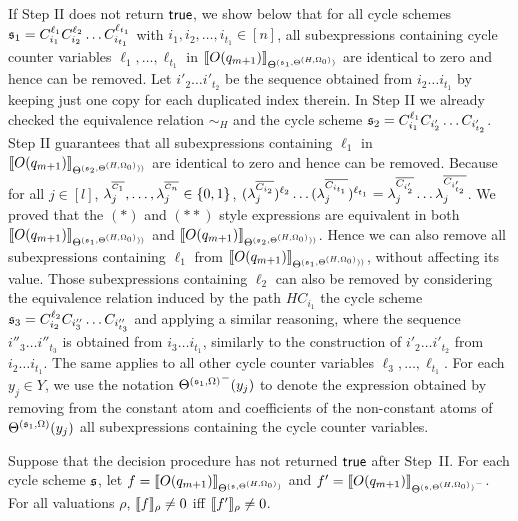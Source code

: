 \smallskip

If Step II does not return $\mathsf{true}$, we show below that for all cycle schemes ${\mathfrak{s} }_1=C_{i_1}^{\ell_1} C_{i_2}^{\ell_2} \dots C_{i_{t_1}}^{\ell_{t_1}}$ with $i_1,i_2,\dots,i_{t_1} \in [n]$, all subexpressions containing cycle counter variables $\ell_1,\dots, \ell_{t_1}$ in $\llbracket O(q_{m+1})\rrbracket_{\Theta^{({\mathfrak{s} }_1, \Theta^{(H,\Omega_0)})}}$ are identical to zero and hence can be removed. Let ${i'_2} \dots {i'_{t_2}}$ be the sequence obtained from $i_2 \dots i_{t_1}$ by keeping just one copy for each duplicated index therein.  
In Step II we already checked the equivalence relation $\sim_H$ and the cycle scheme ${\mathfrak{s} }_2=C_{i_1}^{\ell_1} C_{i'_2} \dots C_{i'_{t_2}}$. Step II guarantees that all subexpressions containing $\ell_1$ in 
$\llbracket O(q_{m+1})\rrbracket_{\Theta^{({\mathfrak{s} }_2, \Theta^{(H,\Omega_0)}))}}$ are identical to zero and hence can be removed.
Because for all $j\in[l]$, $\lambda^{^{\overline{C_1}}}_j, \dots, \lambda^{^{\overline{C_n}}}_j \in \{0,1\}$,   $(\lambda^{\overline{C_{i_2}}}_{j})^{\ell_2} \dots (\lambda^{\overline{C_{i_{t_1}}}}_{j})^{\ell_{t_1}} = \lambda^{\overline{C_{i'_2}}}_{j} \dots \lambda^{\overline{C_{i'_{t_2}}}}_{j}$. We proved that the $(\ast)$ and $(\ast\ast)$ style expressions are equivalent in both $\llbracket O(q_{m+1})\rrbracket_{\Theta^{({\mathfrak{s} }_1, \Theta^{(H,\Omega_0)}))}}$ and $\llbracket O(q_{m+1})\rrbracket_{\Theta^{({\mathfrak{s} }_2, \Theta^{(H,\Omega_0)}))}}$.
Hence we can also remove all subexpressions containing $\ell_1$ from  $\llbracket O(q_{m+1})\rrbracket_{\Theta^{({\mathfrak{s} }_1, \Theta^{(H,\Omega_0)}))}}$, without affecting its value.
Those subexpressions containing $\ell_2$ can also be removed by considering the equivalence relation induced by the path $HC_{i_1}$ the cycle scheme ${\mathfrak{s} }_3=C_{i_2}^{\ell_2} C_{i''_3} \dots C_{i''_{t_3}}$ and applying a similar reasoning, where the sequence ${i''_3} \dots {i''_{t_3}}$ is obtained from ${i_3} \dots  i_{t_1}$, similarly to the construction of ${i'_2} \dots {i'_{t_2}}$ from $i_2 \dots i_{t_1}$. The same applies to all other cycle counter variables $\ell_3,\dots,\ell_{t_1}$.
For each $y_j \in Y$, we use the notation ${\Theta^{({\mathfrak{s} }_1,\Omega)}}^-(y_j)$ to denote the expression obtained by removing from the constant atom and coefficients of the non-constant atoms of $\Theta^{({\mathfrak{s} }_1,\Omega)}(y_j)$ all subexpressions containing the cycle counter variables. 

\begin{lemma}\label{prop-bnd-domain-1}
	Suppose that the decision procedure has not returned $\mathsf{true}$ after Step~II. For each cycle scheme ${\mathfrak{s} }$, let $f=\llbracket O(q_{m+1})\rrbracket_{\Theta^{({\mathfrak{s} }, \Theta^{(H,\Omega_0)})}}$ and $f'=\llbracket O(q_{m+1})\rrbracket_{{\Theta^{({\mathfrak{s} }, \Theta^{(H,\Omega_0)})}}^-}$. For all valuations $\rho$, $\llbracket f\rrbracket_{\rho}\neq 0$ iff $\llbracket f'\rrbracket_{\rho} \neq 0$.
\end{lemma}



